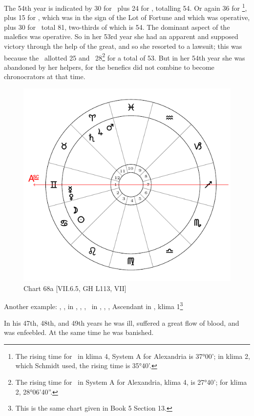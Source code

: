 The 54th year is indicated by 30 for \Saturn\, plus 24 for \Venus, totalling 54. Or again 36 for \Scorpio\footnote{The rising time for \Scorpio\, in klima 4, System A for Alexandria is 37°00'; in klima 2, which Schmidt used, the rising time is 35°40'.}, plus 15 for \Mars, which was in the sign of the Lot of Fortune and which was operative, plus 30
for \Saturn\, total 81, two-thirds of which is 54. The dominant aspect of the malefics was operative. So in her 53rd year she had an apparent and supposed victory through the help of the great, and so she resorted to a lawsuit; this was because the \Moon\, allotted 25 and \Capricorn\, 28\footnote{The rising time for \Capricorn\, in System A for Alexandria, klima 4, is 27°40'; for klima 2, 28°06'40''.} for a total of 53. But in her 54th year
she was abandoned by her helpers, for the benefics did not combine to become chronocrators at that time.

\newpage
\begin{figure}
\centering
\vspace{0pt}
\includegraphics[width=.68\textwidth]{charts/5_10_13}
\caption{Chart 68a [VII.6.5, GH L113, VII]}
\label{fig:chart68a}
\end{figure} 

\noindent Another example: \Sun, \Moon, in \Cancer, \Saturn, \Jupiter, \Mars\, in \Aries, \Venus, \Mercury, Ascendant in \Gemini, klima 1\footnote{This is the same chart given in Book 5 Section 13.}

In his 47th, 48th, and 49th years he was ill, suffered a great flow of blood, and was enfeebled. At the same time he was banished. 


